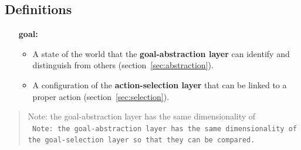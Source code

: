 \documentclass[11pt]{article}
\begin{document}
\subsection{Definitions}

\begin{itemize}[leftmargin=3cm]  
    \item[\textbf{goal:}]

        \begin{itemize}

            \item A state of the world that the \textbf{goal-abstraction layer}
                can identify and distinguish from others
                (section~\ref{sec:abstraction}).

            \item A configuration of the \textbf{action-selection layer} that
                can be linked to a proper action (section~\ref{sec:selection}).

        \end{itemize}

\end{itemize}

\begin{quote}
    Note: the goal-abstraction layer has the same dimensionality of\\ 
    \texttt{
        Note: the goal-abstraction layer has the same dimensionality of\\ 
        the goal-selection layer so that they can be compared.
    }

\end{quote}
\end{document}
